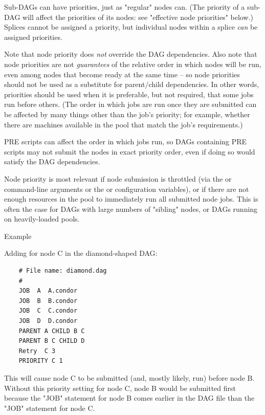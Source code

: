 Sub-DAGs can have priorities, just as "regular" nodes can.  (The
priority of a sub-DAG will affect the priorities of its nodes:
see "effective node priorities" below.)
Splices cannot be assigned a priority, but individual nodes within
a splice \emph{can} be assigned priorities.

Note that node priority does \emph{not} override the DAG dependencies.
Also note that node priorities are not \emph{guarantees}
of the relative order in which nodes will be run, even among nodes that
become ready at the same time -- so node priorities
should not be used as a substitute for parent/child dependencies.
In other words, priorities should be used when it is preferable, but
not required, that some jobs run before others.  (The order in which
jobs are run once they are submitted can be affected by many things
other than the job's priority; for example, whether there are machines
available in the pool that match the job's requirements.)

PRE scripts can affect the order in which jobs run, so DAGs containing
PRE scripts may not submit the nodes in exact priority order, even if
doing so would satisfy the DAG dependencies.

Node priority is most relevant if
node submission is throttled (via the  or 
command-line arguments or the  or
 configuration variables), or if
there are not enough resources in the pool to immediately run all
submitted node jobs.  This is often the case for DAGs with
large numbers of "sibling" nodes, or DAGs running on heavily-loaded
pools.

\begin{description}
\item[Example]
\end{description}

Adding  for node C in the diamond-shaped
DAG:
\footnotesize
\begin{verbatim}
    # File name: diamond.dag
    #
    JOB  A  A.condor 
    JOB  B  B.condor 
    JOB  C  C.condor	
    JOB  D  D.condor
    PARENT A CHILD B C
    PARENT B C CHILD D
    Retry  C 3
    PRIORITY C 1
\end{verbatim}
\normalsize

This will cause node C to be submitted (and, mostly likely, run) before
node B.
Without this priority setting for node C, node B would be submitted first
because the "JOB" statement for node B comes earlier in the DAG file
than the "JOB" statement for node C.

